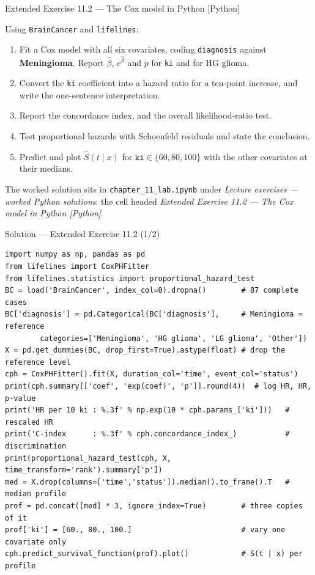 \documentclass[aspectratio=169,11pt]{beamer}
\begin{document}
\begin{frame}{Extended Exercise 11.2 --- The Cox model in Python [Python]}
\begin{longexercise}
  Using \texttt{BrainCancer} and \texttt{lifelines}:
  \begin{enumerate}
    \item Fit a Cox model with all six covariates, coding \texttt{diagnosis} against
          \textbf{Meningioma}. Report $\hat\beta$, $e^{\hat\beta}$ and $p$ for
          \texttt{ki} and for HG glioma.
    \item Convert the \texttt{ki} coefficient into a hazard ratio for a ten-point
          increase, and write the one-sentence interpretation.
    \item Report the concordance index, and the overall likelihood-ratio test.
    \item Test proportional hazards with Schoenfeld residuals and state the conclusion.
    \item Predict and plot $\hat S(t\mid x)$ for $\texttt{ki}\in\{60,80,100\}$ with the
          other covariates at their medians.
  \end{enumerate}
\end{longexercise}
\begin{labnote}
  The worked solution sits in \texttt{chapter\_11\_lab.ipynb} under
  \emph{Lecture exercises --- worked Python solutions}: the cell headed
  \emph{Extended Exercise 11.2 --- The Cox model in Python [Python]}.
\end{labnote}
\end{frame}

\begin{frame}[fragile]{Solution --- Extended Exercise 11.2 (1/2)}
\begin{solutionbox}
\begin{lstlisting}[basicstyle=\ttfamily\scriptsize]
import numpy as np, pandas as pd
from lifelines import CoxPHFitter
from lifelines.statistics import proportional_hazard_test
BC = load('BrainCancer', index_col=0).dropna()        # 87 complete cases
BC['diagnosis'] = pd.Categorical(BC['diagnosis'],     # Meningioma = reference
        categories=['Meningioma', 'HG glioma', 'LG glioma', 'Other'])
X = pd.get_dummies(BC, drop_first=True).astype(float) # drop the reference level
cph = CoxPHFitter().fit(X, duration_col='time', event_col='status')
print(cph.summary[['coef', 'exp(coef)', 'p']].round(4))  # log HR, HR, p-value
print('HR per 10 ki : %.3f' % np.exp(10 * cph.params_['ki']))   # rescaled HR
print('C-index      : %.3f' % cph.concordance_index_)           # discrimination
print(proportional_hazard_test(cph, X, time_transform='rank').summary['p'])
med = X.drop(columns=['time','status']).median().to_frame().T   # median profile
prof = pd.concat([med] * 3, ignore_index=True)        # three copies of it
prof['ki'] = [60., 80., 100.]                         # vary one covariate only
cph.predict_survival_function(prof).plot()            # S(t | x) per profile
\end{lstlisting}
\end{solutionbox}
\end{frame}
\end{document}
